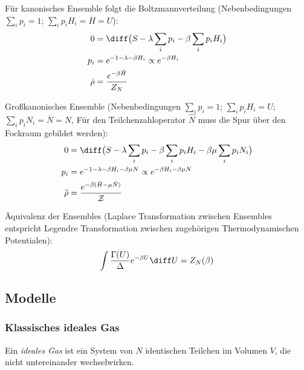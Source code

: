 \documentclass[11pt]{article}
\numberwithin{equation}{section}
\begin{document}
        Für kanonisches Ensemble folgt die Boltzmannverteilung (Nebenbedingungen $\sum_i p_i = 1$; $\sum_i p_i H_i = \overline{H} = U$):
        \begin{equation}
          \begin{aligned}
            0 &= \diff \big( S - \lambda \sum_i p_i - \beta \sum_i p_i H_i \big) \\
            p_i &= e^{-1-\lambda-\beta H_i} \propto e^{-\beta H_i} \\
            \hat{\rho} &= \frac{e^{-\beta \hat{H}}}{Z_N} \\
          \end{aligned}
        \end{equation}

        Großkanonisches Ensemble (Nebenbedingungen $\sum_i p_i = 1$; $\sum_i p_i H_i = U$; $\sum_i p_i N_i = \overline{N} = N$, Für den Teilchenzahloperator $\hat{N}$ muss die Spur über den Fockraum gebildet werden):
        \begin{equation}
          \begin{aligned}
            0 &= \diff \big( S - \lambda \sum_i p_i - \beta \sum_i p_i H_i - \beta\mu \sum_i p_i N_i \big) \\
            p_i &= e^{-1-\lambda-\beta H_i-\beta\mu N} \propto e^{-\beta H_i - \beta\mu N} \\
            \hat{\rho} &= \frac{e^{-\beta (\hat{H} - \mu \hat{N})}}{\mathcal{Z}} \\
          \end{aligned}
        \end{equation}

        Äquivalenz der Ensembles (Laplace Transformation zwischen Ensembles entspricht Legendre Transformation zwischen zugehörigen Thermodynamischen Potentialen):
        \begin{equation}
          \int \frac{\Gamma(U)}{\Delta} e^{-\beta U} \diff U = Z_N(\beta)
        \end{equation}



    \subsection{Modelle}
      \subsubsection{Klassisches ideales Gas}
        Ein \emph{ideales Gas} ist ein System von $N$ identischen Teilchen im Volumen $V$, die nicht untereinander wechselwirken. \vsp
\end{document}

